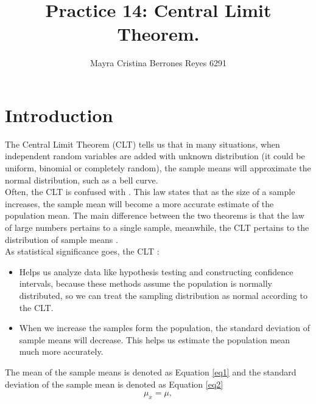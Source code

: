 \documentclass{article}
\begin{document}
\title{%
  Practice 14: Central Limit Theorem. } %
\author{Mayra Cristina Berrones Reyes 6291}

\maketitle

\section{Introduction}

The Central Limit Theorem (CLT) tells us that in many situations, when independent random variables are added with unknown distribution (it could be uniform, binomial or completely random), the sample means will approximate the normal distribution, such as a bell curve. \\

Often, the CLT is confused with . This law states that as the size of a sample increases, the sample mean will become a more accurate estimate of the population mean. The main difference between the two theorems is that the law of large numbers pertains to a single sample, meanwhile, the CLT pertains to the distribution of sample means \cite{twds}. \\

As statistical significance goes, the CLT \cite{bot}:

\begin{itemize}
\item Helps us analyze data like hypothesis testing and constructing confidence intervals, because these methods assume the population is normally distributed, so we can treat the sampling distribution as normal according to the CLT.
\item When we increase the samples form the population, the standard deviation of sample means will decrease. This helps us estimate the population mean much more accurately.
\end{itemize}

The mean of the sample means is denoted as Equation \ref{eq1} and the standard deviation of the sample mean is denoted as Equation \ref{eq2}\\

\begin{eqnarray}
\label{eq1}
\mu_{\overline{x}} = \mu,
\end{eqnarray}
\end{document}
